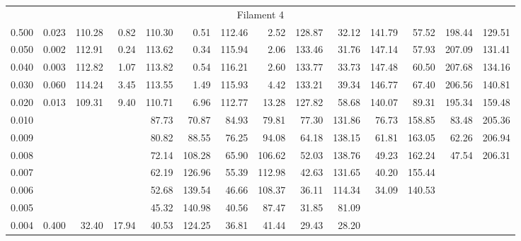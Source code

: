 \begin{tabular}{@{}lrrrrrrrrrrrrr@{}}
\midrule
\multicolumn{14}{c}{Filament 4} \\
\cmidrule{1-14}
0.500 & 0.023 & 110.28 & 0.82 & 110.30 & 0.51 & 112.46 & 2.52 & 128.87 & 32.12 & 141.79 & 57.52 & 198.44 & 129.51 \\
0.050 & 0.002 & 112.91 & 0.24 & 113.62 & 0.34 & 115.94 & 2.06 & 133.46 & 31.76 & 147.14 & 57.93 & 207.09 & 131.41 \\
0.040 & 0.003 & 112.82 & 1.07 & 113.82 & 0.54 & 116.21 & 2.60 & 133.77 & 33.73 & 147.48 & 60.50 & 207.68 & 134.16 \\
0.030 & 0.060 & 114.24 & 3.45 & 113.55 & 1.49 & 115.93 & 4.42 & 133.21 & 39.34 & 146.77 & 67.40 & 206.56 & 140.81 \\
0.020 & 0.013 & 109.31 & 9.40 & 110.71 & 6.96 & 112.77 & 13.28 & 127.82 & 58.68 & 140.07 & 89.31 & 195.34 & 159.48 \\
0.010 &       &        &      & 87.73 & 70.87 & 84.93 & 79.81 & 77.30 & 131.86 & 76.73 & 158.85 & 83.48 & 205.36 \\
0.009 &       &        &      & 80.82 & 88.55 & 76.25 & 94.08 & 64.18 & 138.15 & 61.81 & 163.05 & 62.26 & 206.94 \\
0.008 &       &        &      & 72.14 & 108.28 & 65.90 & 106.62 & 52.03 & 138.76 & 49.23 & 162.24 & 47.54 & 206.31 \\
0.007 &       &        &      & 62.19 & 126.96 & 55.39 & 112.98 & 42.63 & 131.65 & 40.20 & 155.44 &       &            \\
0.006 &       &        &      & 52.68 & 139.54 & 46.66 & 108.37 & 36.11 & 114.34 & 34.09 & 140.53 &       &            \\
0.005 &       &        &      & 45.32 & 140.98 & 40.56 & 87.47 & 31.85 & 81.09 &        &            &       &            \\
0.004 & 0.400 &  32.40 & 17.94 & 40.53 & 124.25 & 36.81 & 41.44 & 29.43 & 28.20 &       &            &       &            \\


\end{tabular}

